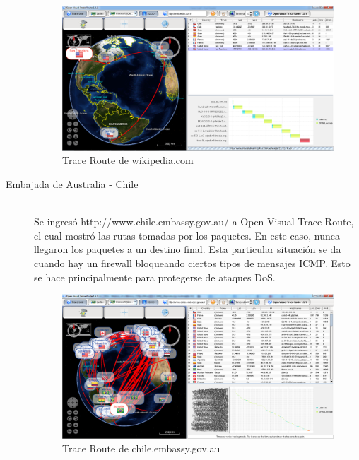 \documentclass{article}
\begin{document}
\begin{description}
\begin{figure}[H]
\centering
\includegraphics[width=\textwidth]{tracerouteWikipedia.png}
\caption{Trace Route de wikipedia.com}
\label{fig:wikipedia}
\end{figure}    
  
\clearpage

\item[Embajada de Australia - Chile] \hfill \\
Se ingresó http://www.chile.embassy.gov.au/ a Open Visual Trace Route, el cual mostró las rutas tomadas por los paquetes. En este caso, nunca llegaron los paquetes a un destino final. Esta particular situación se da cuando hay un firewall bloqueando ciertos tipos de mensajes ICMP. Esto se hace principalmente para protegerse de ataques DoS.

\begin{figure}[H]
\centering
\includegraphics[width=\textwidth]{traceroute_australia.png}
\caption{Trace Route de chile.embassy.gov.au}
\label{fig:embajadaChilena}
\end{figure}  

\end{description}
\end{document}
